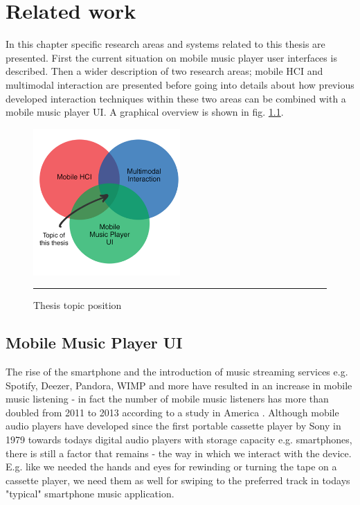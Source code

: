 \chapter{Related work}
In this chapter specific research areas and systems related to this thesis are presented. First the current situation on mobile music player user interfaces is described. Then a wider description of two research areas; mobile HCI and multimodal interaction are presented before going into details about how previous developed interaction techniques within these two areas can be combined with a mobile music player UI. A graphical overview is shown in fig. \ref{fig:venn}.

\begin{figure}[htbp]
	\centering
		\includegraphics[width=0.5\textwidth,height=\textheight,keepaspectratio]{./Figures/venn.png}
		\rule{35em}{0.5pt}
	\caption[Venn diagram]{Thesis topic position}
	\label{fig:venn}
\end{figure}


\section{Mobile Music Player UI}

The rise of the smartphone and the introduction of music streaming services e.g. Spotify, Deezer, Pandora, WIMP and more have resulted in an increase in mobile music listening - in fact the number of mobile music listeners has more than doubled from 2011 to 2013 according to a study in America \cite{emarketer_music_2014}. Although mobile audio players have developed since the first portable cassette player by Sony in 1979 towards todays digital audio players with storage capacity e.g. smartphones, there is still a factor that remains - the way in which we interact with the device. E.g. like we needed the hands and eyes for rewinding or turning the tape on a cassette player, we need them as well for swiping to the preferred track in todays "typical" smartphone music application.

